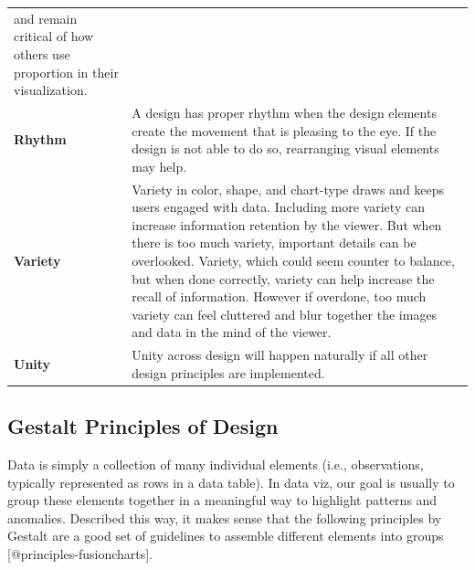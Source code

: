 \documentclass[]{book}
\theoremstyle{definition}
\theoremstyle{definition}
\theoremstyle{definition}
\theoremstyle{remark}
\begin{document}
\begin{longtable}[]{@{}ll@{}}
\begin{minipage}[t]{0.78\columnwidth}
and remain critical of how others use proportion in their
visualization.\strut
\end{minipage}\tabularnewline
\begin{minipage}[t]{0.16\columnwidth}\raggedright\strut
\textbf{Rhythm}\strut
\end{minipage} & \begin{minipage}[t]{0.78\columnwidth}\raggedright\strut
A design has proper rhythm when the design elements create the movement
that is pleasing to the eye. If the design is not able to do so,
rearranging visual elements may help.\strut
\end{minipage}\tabularnewline
\begin{minipage}[t]{0.16\columnwidth}\raggedright\strut
\textbf{Variety}\strut
\end{minipage} & \begin{minipage}[t]{0.78\columnwidth}\raggedright\strut
Variety in color, shape, and chart-type draws and keeps users engaged
with data. Including more variety can increase information retention by
the viewer. But when there is too much variety, important details can be
overlooked. Variety, which could seem counter to balance, but when done
correctly, variety can help increase the recall of information. However
if overdone, too much variety can feel cluttered and blur together the
images and data in the mind of the viewer.\strut
\end{minipage}\tabularnewline
\begin{minipage}[t]{0.16\columnwidth}\raggedright\strut
\textbf{Unity}\strut
\end{minipage} & \begin{minipage}[t]{0.78\columnwidth}\raggedright\strut
Unity across design will happen naturally if all other design principles
are implemented.\strut
\end{minipage}\tabularnewline
\bottomrule
\end{longtable}

\subsection{Gestalt Principles of
Design}\label{gestalt-principles-of-design}

Data is simply a collection of many individual elements (i.e.,
observations, typically represented as rows in a data table). In data
viz, our goal is usually to group these elements together in a
meaningful way to highlight patterns and anomalies. Described this way,
it makes sense that the following principles by Gestalt are a good set
of guidelines to assemble different elements into groups
{[}@principles-fusioncharts{]}.
\end{document}

